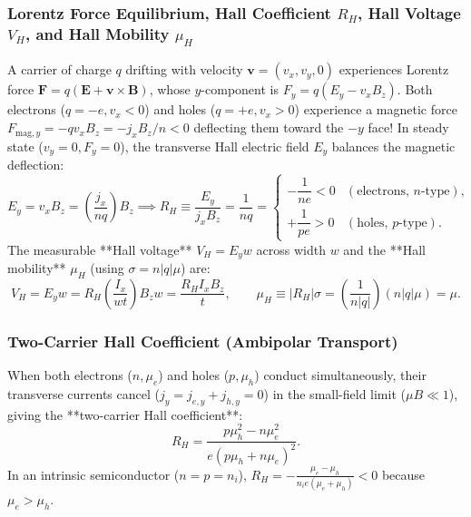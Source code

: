 \documentclass[11pt,a4paper]{article}
\newcommand{\abs}[1]{\left|#1\right|}
\newcommand{\vb}[1]{\mathbf{#1}}
\begin{document}
\subsubsection{Lorentz Force Equilibrium, Hall Coefficient \texorpdfstring{$R_H$}{R_H}, Hall Voltage \texorpdfstring{$V_H$}{V_H}, and Hall Mobility \texorpdfstring{$\mu_H$}{mu_H}}
A carrier of charge $q$ drifting with velocity $\vb{v} = (v_x, v_y, 0)$ experiences Lorentz force $\vb{F} = q(\vb{E} + \vb{v}\times\vb{B})$, whose $y$-component is $F_y = q(E_y - v_x B_z)$. Both electrons ($q = -e, v_x < 0$) and holes ($q = +e, v_x > 0$) experience a magnetic force $F_{\mathrm{mag},y} = -qv_x B_z = -j_x B_z / n < 0$ deflecting them toward the $-y$ face! In steady state ($v_y = 0, F_y = 0$), the transverse Hall electric field $E_y$ balances the magnetic deflection:
\begin{equation}
    E_y = v_x B_z = \left(\frac{j_x}{nq}\right)B_z \implies \boxed{R_H \equiv \frac{E_y}{j_x B_z} = \frac{1}{nq} = \begin{cases} -\dfrac{1}{ne} < 0 & (\text{electrons, } n\text{-type}), \\[8pt] +\dfrac{1}{pe} > 0 & (\text{holes, } p\text{-type}). \end{cases}}
\end{equation}
The measurable **Hall voltage** $V_H = E_y w$ across width $w$ and the **Hall mobility** $\mu_H$ (using $\sigma = n\abs{q}\mu$) are:
\begin{equation}
    \boxed{V_H = E_y w = R_H\left(\frac{I_x}{wt}\right)B_z w = \frac{R_H I_x B_z}{t}, \qquad \mu_H \equiv \abs{R_H}\sigma = \left(\frac{1}{n\abs{q}}\right)(n\abs{q}\mu) = \mu.}
\end{equation}

\subsubsection{Two-Carrier Hall Coefficient (Ambipolar Transport)}
When both electrons ($n, \mu_e$) and holes ($p, \mu_h$) conduct simultaneously, their transverse currents cancel ($j_y = j_{e,y} + j_{h,y} = 0$) in the small-field limit ($\mu B \ll 1$), giving the **two-carrier Hall coefficient**:
\begin{equation}
    \boxed{R_H = \frac{p\mu_h^2 - n\mu_e^2}{e(p\mu_h + n\mu_e)^2}.}
    \label{eq:two_carrier_hall_master}
\end{equation}
In an intrinsic semiconductor ($n = p = n_i$), $R_H = -\frac{\mu_e - \mu_h}{n_i e(\mu_e + \mu_h)} < 0$ because $\mu_e > \mu_h$.
\end{document}
